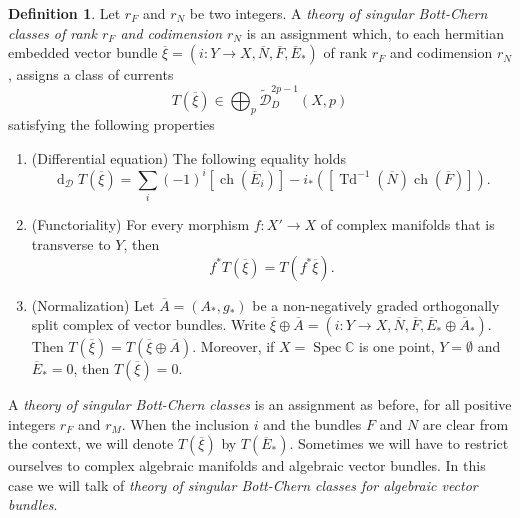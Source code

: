 \documentclass[10pt,twoside]{article}
\numberwithin{equation}{section}
\theoremstyle{plain}
\theoremstyle{definition}
\newtheorem{definition}[equation]{Definition}
\DeclareMathOperator{\Td}{Td}
\DeclareMathOperator{\dd}{d}
\DeclareMathOperator{\ch}{ch}
\DeclareMathOperator{\Spec}{Spec}
\begin{document}
\begin{definition}
  \label{def:7}
  Let $r_{F}$ and $r_{N}$ be two integers.
  A \emph{theory of singular Bott-Chern classes of rank $r_{F}$ and
  codimension $r_{N}$} is an assignment 
  which, to each hermitian embedded vector bundle $\overline {\xi}=
  (i\colon Y\longrightarrow 
  X,\overline N, \overline 
  F, \overline E_{\ast}) $ of rank $r_{F}$ and codimension $r_{N}$,
  assigns a class of currents 
  \begin{displaymath}
    T(\overline \xi)\in \bigoplus_{p} \widetilde
     {\mathcal{D}}^{2p-1}_{D}(X,p) 
  \end{displaymath}
  satisfying the following properties
  \begin{enumerate}
  \item \label{item:15} (Differential equation) The following equality
    holds 
    \begin{equation}\label{eq:42}
      \dd_{\mathcal{D}} T(\overline \xi)=
      \sum_{i}(-1)^{i}[\ch(\overline
      E_{i})]-i_{\ast}([\Td^{-1}(\overline N)\ch(\overline F)]). 
    \end{equation}
  \item \label{item:16}(Functoriality) For every morphism
    $f\colon X'\longrightarrow X$ of 
    complex manifolds that is transverse to $Y$, then 
    \begin{displaymath}
      f^{\ast} T(\overline \xi)=T(f^{\ast} \overline
      \xi). 
    \end{displaymath}
  \item \label{item:17}(Normalization)  Let $\overline A=(
    A_{\ast},g_{\ast})$ be a non-negatively graded orthogonally split
    complex of vector 
    bundles. Write $\overline{\xi}\oplus \overline
    A=(i\colon Y\longrightarrow 
    X,\overline N, \overline 
    F, \overline E_{\ast}\oplus \overline A_{\ast})$.
    Then
    $T(\overline \xi)=T(\overline \xi\oplus \overline A)$. Moreover,
    if $X=\Spec \mathbb{C}$ is one point, $Y=\emptyset$ and $\overline
    E_{\ast}=0$, then $T(\overline \xi)=0$.
  \end{enumerate}
  
  A \emph{theory of singular Bott-Chern classes} is an assignment as
  before, for all positive integers $r_{F}$ and $r_{M}$. When the
  inclusion $i$ and the bundles $F$ and $N$ are clear from the context,
  we will denote $T(\overline \xi)$ by $T(\overline
  E_{\ast})$. Sometimes we will have to restrict ourselves to complex
  algebraic manifolds and algebraic vector bundles. In this case we
  will talk of \emph{theory of singular Bott-Chern classes for
    algebraic vector bundles}.  
\end{definition}
\end{document}
